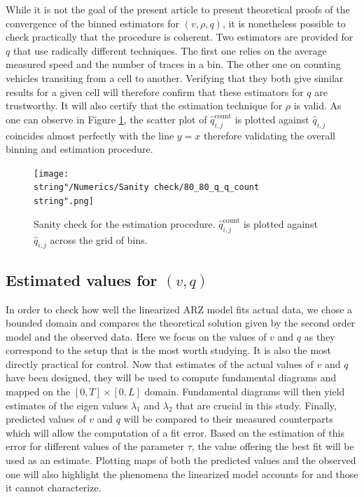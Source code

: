 \documentclass[preprint]{elsarticle}
\begin{document}
While it is not the goal of the present article to present theoretical proofs of the convergence
of the binned estimators for $\left(v,\rho,q\right)$, it is nonetheless possible to check practically that the procedure
is coherent. Two estimators are provided for $q$ that use radically
different techniques. The first one relies on the average measured
speed and the number of traces in a bin. The other one on counting
vehicles transiting from a cell to another. Verifying that they both
give similar results for a given cell will therefore confirm that
these estimators for $q$ are trustworthy. It will also certify that
the estimation technique for $\rho$ is valid. As one can observe
in Figure \ref{fig:Sanity-check}, the scatter plot of $\widehat{q}_{i,j}^{\text{count}}$
is plotted against $\widehat{q}_{i,j}$ coincides almost perfectly
with the line $y=x$ therefore validating the overall binning and
estimation procedure.

\begin{figure}[H]
\centering
\texttt{[image: \\string"/Numerics/Sanity check/80\_80\_q\_q\_count\\string".png]}
\protect\caption{Sanity check for the estimation procedure. $\widehat{q}_{i,j}^{\text{count}}$
is plotted against $\widehat{q}_{i,j}$ across the grid of bins.
\label{fig:Sanity-check}}
\end{figure}



\subsection{Estimated values for $\left(v,q\right)$}

In order to check how well the linearized ARZ model fits actual data,
we chose a bounded domain and compares the theoretical solution
given by the second order model and the observed data. Here we focus
on the values of $v$ and $q$ as they correspond to the setup that
is the most worth studying. It is also the most directly practical
for control. Now that estimates of the actual values of $v$ and $q$
have been designed, they will be used to compute fundamental diagrams
and mapped on the $\left[0,T\right]\times\left[0,L\right]$ domain.
Fundamental diagrams will then yield estimates of the eigen values
$\lambda_{1}$ and $\lambda_{2}$ that are crucial in this study.
Finally, predicted values of $v$ and $q$ will be compared to their
measured counterparts which will allow the computation of a fit error.
Based on the estimation of this error for different values of the
parameter $\tau$, the value offering the best fit will be used
as an estimate. Plotting maps of both the predicted values and the
observed one will also highlight the phenomena the linearized model
accounts for and those it cannot characterize.
\end{document}
